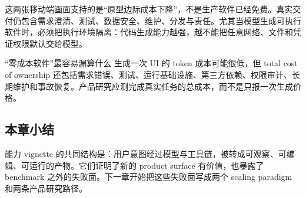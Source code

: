 


这两张移动端画面支持的是“原型边际成本下降”，不是生产软件已经免费。真实交付仍包含需求澄清、测试、数据安全、维护、分发与责任。尤其当模型生成可执行软件时，必须把执行环境隔离：代码生成能力越强，越不能把任意网络、文件和凭证权限默认交给模型。


\begin{warningbox}{“零成本软件”最容易漏算什么}
生成一次 UI 的 token 成本可能很低，但 total cost of ownership 还包括需求错误、测试、运行基础设施、第三方依赖、权限审计、长期维护和事故恢复。产品研究应测完成真实任务的总成本，而不是只报一次生成价格。
\end{warningbox}

\subsection{本章小结}

能力 vignette 的共同结构是：用户意图经过模型与工具链，被转成可观察、可编辑、可运行的产物。它们证明了新的 product surface 有价值，也暴露了 benchmark 之外的失败面。下一章开始把这些失败面写成两个 scaling paradigm 和两条产品研究路径。

